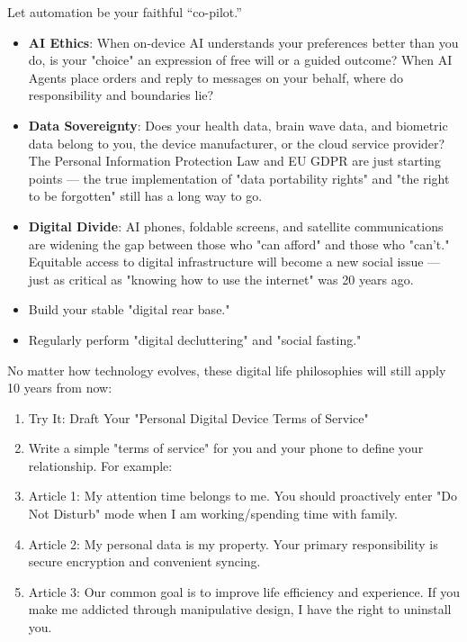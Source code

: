 Let automation be your faithful “co-pilot.”

\begin{itemize}
  \item \textbf{AI Ethics}: When on-device AI understands your preferences better than you do, is your "choice" an expression of free will or a guided outcome? When AI Agents place orders and reply to messages on your behalf, where do responsibility and boundaries lie?
  \item \textbf{Data Sovereignty}: Does your health data, brain wave data, and biometric data belong to you, the device manufacturer, or the cloud service provider? The Personal Information Protection Law and EU GDPR are just starting points — the true implementation of "data portability rights" and "the right to be forgotten" still has a long way to go.
  \item \textbf{Digital Divide}: AI phones, foldable screens, and satellite communications are widening the gap between those who "can afford" and those who "can't." Equitable access to digital infrastructure will become a new social issue — just as critical as "knowing how to use the internet" was 20 years ago.
  \item Build your stable "digital rear base."
  \item Regularly perform "digital decluttering" and "social fasting."
\end{itemize}


No matter how technology evolves, these digital life philosophies will still apply 10 years from now:

\begin{enumerate}
  \item Try It: Draft Your "Personal Digital Device Terms of Service"
  \item Write a simple "terms of service" for you and your phone to define your relationship. For example:
  \item Article 1: My attention time belongs to me. You should proactively enter "Do Not Disturb" mode when I am working/spending time with family.
  \item Article 2: My personal data is my property. Your primary responsibility is secure encryption and convenient syncing.
  \item Article 3: Our common goal is to improve life efficiency and experience. If you make me addicted through manipulative design, I have the right to uninstall you.
\end{enumerate}


